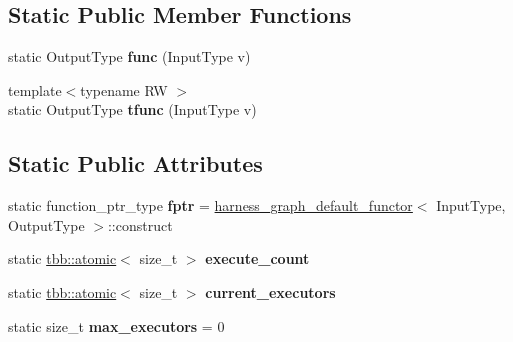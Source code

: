 \subsection*{Static Public Member Functions}
\begin{DoxyCompactItemize}
\item 
\hypertarget{structharness__graph__executor_ac41a80aba49bfa67becad7f3af86922e}{}static Output\+Type {\bfseries func} (Input\+Type v)\label{structharness__graph__executor_ac41a80aba49bfa67becad7f3af86922e}

\item 
\hypertarget{structharness__graph__executor_a9dbd81d48f683b5f9f5d8ad05e7c6b73}{}{\footnotesize template$<$typename R\+W $>$ }\\static Output\+Type {\bfseries tfunc} (Input\+Type v)\label{structharness__graph__executor_a9dbd81d48f683b5f9f5d8ad05e7c6b73}

\end{DoxyCompactItemize}
\subsection*{Static Public Attributes}
\begin{DoxyCompactItemize}
\item 
\hypertarget{structharness__graph__executor_ac604f5a7f78cef4b5877b1bd6a0aa8f9}{}static function\+\_\+ptr\+\_\+type {\bfseries fptr} = \hyperlink{structharness__graph__default__functor}{harness\+\_\+graph\+\_\+default\+\_\+functor}$<$ Input\+Type, Output\+Type $>$\+::construct\label{structharness__graph__executor_ac604f5a7f78cef4b5877b1bd6a0aa8f9}

\item 
\hypertarget{structharness__graph__executor_ac4b90795ca538aa88c7f26c1667e690e}{}static \hyperlink{structtbb_1_1atomic}{tbb\+::atomic}$<$ size\+\_\+t $>$ {\bfseries execute\+\_\+count}\label{structharness__graph__executor_ac4b90795ca538aa88c7f26c1667e690e}

\item 
\hypertarget{structharness__graph__executor_ac28da2b67532980a9a6688f279a4ef4e}{}static \hyperlink{structtbb_1_1atomic}{tbb\+::atomic}$<$ size\+\_\+t $>$ {\bfseries current\+\_\+executors}\label{structharness__graph__executor_ac28da2b67532980a9a6688f279a4ef4e}

\item 
\hypertarget{structharness__graph__executor_a00aa3dfb696a62986d26c143383fad94}{}static size\+\_\+t {\bfseries max\+\_\+executors} = 0\label{structharness__graph__executor_a00aa3dfb696a62986d26c143383fad94}

\end{DoxyCompactItemize}



